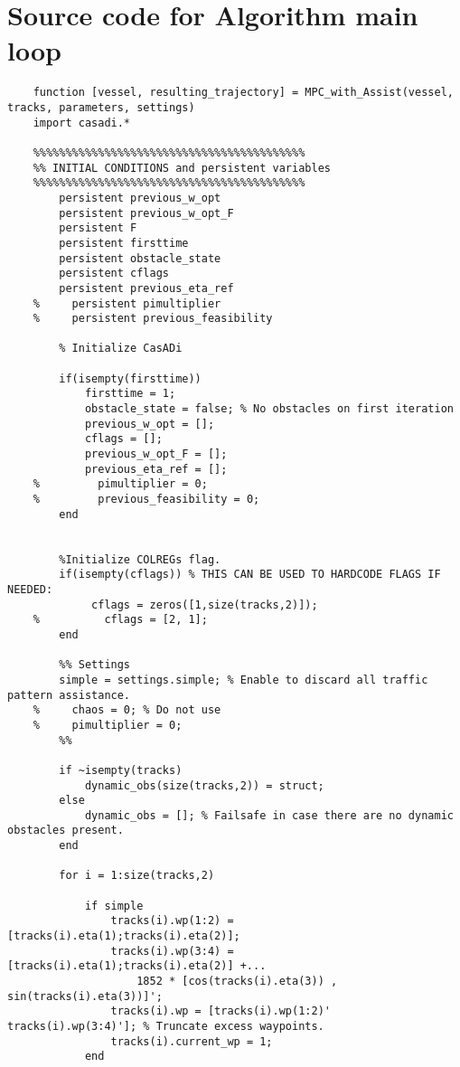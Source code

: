\appendix
\section{Source code for Algorithm main loop}
\begin{lstlisting}
    function [vessel, resulting_trajectory] = MPC_with_Assist(vessel, tracks, parameters, settings)
    import casadi.*
    
    %%%%%%%%%%%%%%%%%%%%%%%%%%%%%%%%%%%%%%%%%%
    %% INITIAL CONDITIONS and persistent variables
    %%%%%%%%%%%%%%%%%%%%%%%%%%%%%%%%%%%%%%%%%%
        persistent previous_w_opt
        persistent previous_w_opt_F
        persistent F
        persistent firsttime
        persistent obstacle_state
        persistent cflags
        persistent previous_eta_ref
    %     persistent pimultiplier
    %     persistent previous_feasibility
           
        % Initialize CasADi
        
        if(isempty(firsttime))
            firsttime = 1;
            obstacle_state = false; % No obstacles on first iteration
            previous_w_opt = [];
            cflags = [];
            previous_w_opt_F = [];
            previous_eta_ref = [];
    %         pimultiplier = 0;
    %         previous_feasibility = 0;
        end
        
    
        %Initialize COLREGs flag.
        if(isempty(cflags)) % THIS CAN BE USED TO HARDCODE FLAGS IF NEEDED:
             cflags = zeros([1,size(tracks,2)]);
    %          cflags = [2, 1];
        end
    
        %% Settings
        simple = settings.simple; % Enable to discard all traffic pattern assistance.
    %     chaos = 0; % Do not use
    %     pimultiplier = 0;
        %%
        
        if ~isempty(tracks)
            dynamic_obs(size(tracks,2)) = struct;
        else
            dynamic_obs = []; % Failsafe in case there are no dynamic obstacles present.
        end
        
        for i = 1:size(tracks,2)
            
            if simple
                tracks(i).wp(1:2) = [tracks(i).eta(1);tracks(i).eta(2)];
                tracks(i).wp(3:4) = [tracks(i).eta(1);tracks(i).eta(2)] +...
                    1852 * [cos(tracks(i).eta(3)) , sin(tracks(i).eta(3))]';
                tracks(i).wp = [tracks(i).wp(1:2)' tracks(i).wp(3:4)']; % Truncate excess waypoints.
                tracks(i).current_wp = 1;
            end
        

\end{lstlisting}
